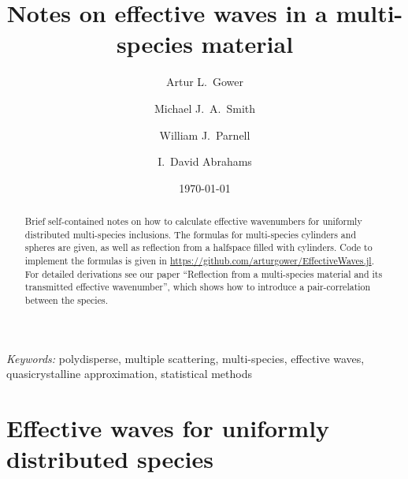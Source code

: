 \documentclass[12pt, a4paper]{article}
\begin{document}
\title{Notes on effective waves in a multi-species material}


\author[$\dagger$]{Artur L.\ Gower}
\author[$\dagger$]{Michael J.\ A.\ Smith}
\author[$\dagger$]{William J.\ Parnell}
\author[$\star$]{I.\ David Abrahams}


\date{\today}
\maketitle

\begin{abstract}
Brief self-contained notes on how to calculate effective wavenumbers for uniformly distributed multi-species inclusions. The formulas for multi-species cylinders and spheres are given, as well as reflection from a halfspace filled with cylinders. Code to implement the formulas is given in \url{https://github.com/arturgower/EffectiveWaves.jl}.  For detailed derivations see our paper ``Reflection from a multi-species material and its transmitted effective wavenumber'', which shows how to introduce a pair-correlation between the species.
\end{abstract}

\noindent
{\textit{Keywords:} polydisperse, multiple scattering, multi-species, effective waves, quasicrystalline approximation, statistical methods }


\section{Effective waves for uniformly distributed species}
\label{sec:results}
\end{document}
